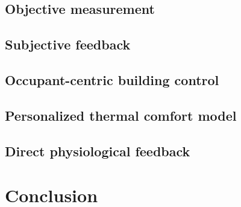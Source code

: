 \documentclass[review]{elsarticle}
\begin{document}
    \subsection{Objective measurement}
    
    \subsection{Subjective feedback}
    
    \subsection{Occupant-centric building control}
    \subsection{Personalized thermal comfort model}
    \subsection{Direct physiological feedback}
\section{Conclusion}


\end{document}
